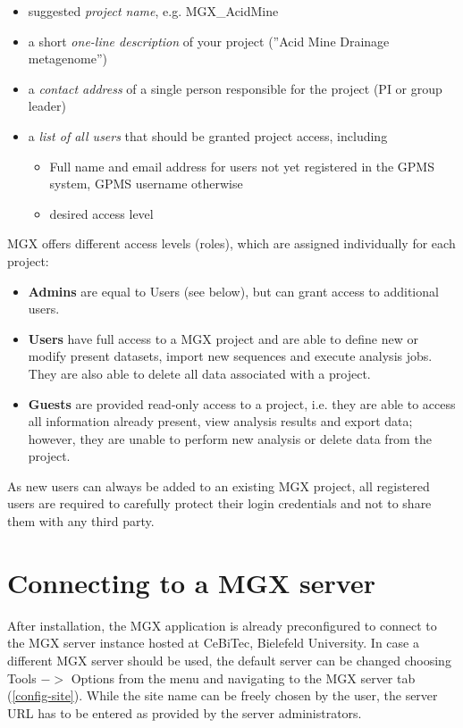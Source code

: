 \begin{itemize}
  \item suggested \textit{project name}, e.g. MGX\_AcidMine
  \item a short \textit{one-line description} of your project (''Acid Mine Drainage metagenome'')
  \item a \textit{contact address} of a single person responsible for the project (PI or group leader)
  \item a \textit{list of all users} that should be granted project access, including
    \begin{itemize}
      \item Full name and email address for users not yet registered in the GPMS system, GPMS username otherwise
      \item desired access level
    \end{itemize}
\end{itemize}

MGX offers different access levels (roles), which are assigned individually for each
project: \\

\begin{itemize}
  \item{\textbf{Admins} are equal to Users (see below), but can grant access to additional users.}
  \item \textbf{Users} have full access to a MGX project and are able to define new or modify
present datasets, import new sequences and execute analysis jobs. They are also able to
delete all data associated with a project.
  \item \textbf{Guests} are provided read-only access to a project, i.e. they are able to access
all information already present, view analysis results and export data; however, they are
unable to perform new analysis or delete data from the project.
\end{itemize}

As new users can always be added to an existing MGX project, all registered users are required
to carefully protect their login credentials and not to share them with any third party.

\section{Connecting to a MGX server}

After installation, the MGX application is already preconfigured to connect to the 
MGX server instance hosted at CeBiTec, Bielefeld University. In case a different MGX server
should be used, the default server can be changed choosing Tools $->$ Options from the menu
and navigating to the MGX server tab (\ref{config-site}). While the site name can be freely
chosen by the user, the server URL has to be entered as provided by the server administrators.

